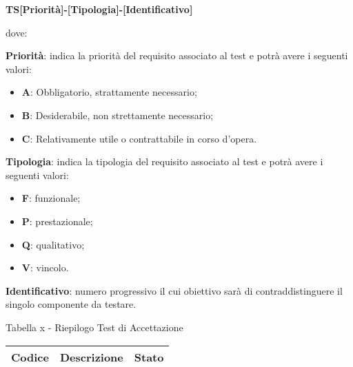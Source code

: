 		\begin{center}
		\textbf{TS[Priorità]-[Tipologia]-[Identificativo]}
		\end{center}
		dove: 
		
		\textbf{Priorità}: indica la priorità del requisito associato al test e potrà avere i seguenti valori:
		\begin{itemize}
		 	\item \textbf{A}: Obbligatorio, strattamente necessario;
		 	\item \textbf{B}: Desiderabile, non strettamente necessario;
		 	\item \textbf{C}: Relativamente utile o contrattabile in corso d'opera. 
		 \end{itemize} 
		 \textbf{Tipologia}: indica la tipologia del requisito associato al test e potrà avere i seguenti valori:
		 \begin{itemize}
		 	\item \textbf{F}: funzionale;
		 	\item \textbf{P}: prestazionale;
		 	\item \textbf{Q}: qualitativo;
		 	\item \textbf{V}: vincolo.
		 \end{itemize}
		\textbf{Identificativo}: numero progressivo il cui obiettivo sarà di contraddistinguere il singolo componente da testare.

		\begin{center}
		Tabella x - Riepilogo Test di Accettazione
			\begin{longtable}{|c|p{8cm}|c|}
			\hline
			\rowcolor{lighter-grayer}
			\textbf{Codice} & \textbf{Descrizione} & \textbf{Stato} \\
			\hline
			\endfirsthead

			\hline
			\hline

			\end{longtable}
		\end{center}


